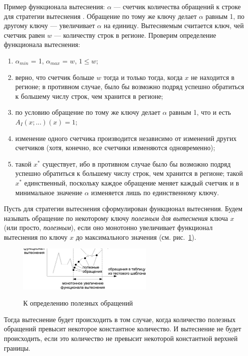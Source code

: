 \begin{enumerate}
Пример функционала вытеснения: $\alpha$ --- счетчик количества обращений к строке
для стратегии вытеснения \LRU. Обращение по тому же ключу делает $\alpha$
равным 1, по другому ключу --- увеличивает $\alpha$ на единицу. Вытесняемым
считается ключ, чей счетчик равен $w$ --- количеству строк в регионе. Проверим
определение функционала вытеснения:
\begin{enumerate}
    \item $\alpha_{min}$ = 1, $\alpha_{max}$ = $w$, $1 \leqslant w$;
    \item верно, что счетчик больше $w$ тогда и только тогда, когда $x$ не
находится в регионе; в противном случае, было бы возможно подряд успешно обратиться к
большему числу строк, чем хранится в регионе;
    \item по условию обращение по тому же ключу делает $\alpha$ равным 1, что
и есть $A_I(x;...)(x) = 1$;
    \item изменение одного счетчика производится независимо от изменений других счетчиков (хотя, конечно, все счетчики изменяются одновременно);
    \item такой $x^*$ существует, ибо в противном случае было бы возможно подряд успешно обратиться к большему числу строк, чем хранится в регионе; такой $x^*$ единственный, поскольку каждое обращение меняет каждый счетчик и в минимальное значение $\alpha$ изменяется лишь по единственному ключу.
\end{enumerate}

Пусть для стратегии вытеснения сформулирован функционал вытеснения. Будем называть
обращение по некоторому ключу \emph{полезным для вытеснения} ключа
$x$ (или просто, \emph{полезным}), если оно монотонно увеличивает функционал вытеснения по
ключу $x$ до максимального значения (см. рис.~\ref{useful}).\\

\begin{figure}[h] \center
  \includegraphics[width=0.6\textwidth]{2.theor/useful}\\
  \caption{К определению полезных обращений}\label{useful}
\end{figure}

Тогда вытеснение будет происходить в том случае, когда количество
полезных обращений превысит некоторое константное количество.
И вытеснение не будет происходить, если это количество не превысит некоторой константной верхней границы.


\end{enumerate}
